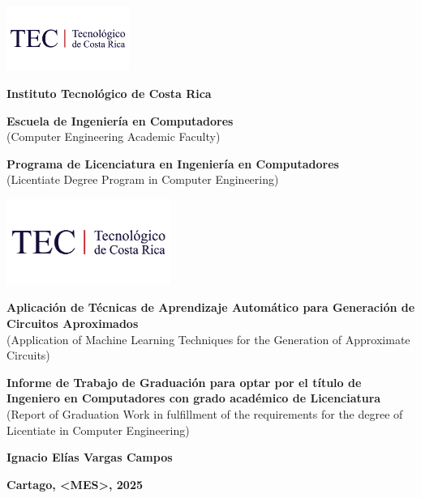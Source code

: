 \begin{titlepage}
    \raggedright
    \addtolength{\topmargin}{-1cm}
    \includegraphics[width = 40mm]{imágenes/logo tec.png}

    \begin{center}
        \vspace*{1cm}

        {\large\textbf{Instituto Tecnológico de Costa Rica}}

        \vspace{0.3cm}

        {\large\textbf{Escuela de Ingeniería en Computadores}}\\
        {\small{(Computer Engineering Academic Faculty)}}

        \vspace{0.3cm}

        {\large\textbf{Programa de Licenciatura en Ingeniería en Computadores}}\\
        {\small{(Licentiate Degree Program in Computer Engineering)}}

        \vspace{0.5cm}

        \includegraphics[width=0.4\textwidth]{imágenes/logo tec.png}
        \vspace{1cm}

        {\large\textbf{Aplicación de Técnicas de Aprendizaje Automático para Generación de Circuitos Aproximados
        }}\\
        {\small{(Application of Machine Learning Techniques for the Generation of Approximate Circuits)}}

        \vspace{2cm}

        {\large\textbf{Informe de Trabajo de Graduación para optar por el título de Ingeniero en Computadores con grado académico de Licenciatura}}\\
        {\small{(Report of Graduation Work in fulfillment of the requirements for the degree of Licentiate in Computer Engineering)}}

        \vspace{3cm}

        {\large\textbf{Ignacio Elías Vargas Campos}}

        \vfill

        {\large\textbf{
        Cartago, <MES>, 2025
        }}
    \end{center}
\end{titlepage}
